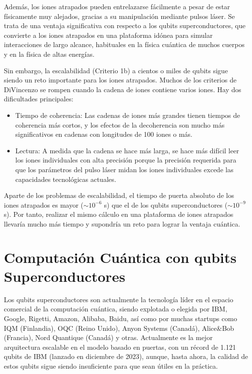Además, los iones atrapados pueden entrelazarse fácilmente a pesar de estar físicamente muy alejados, gracias a su manipulación mediante pulsos láser. Se trata de una ventaja significativa con respecto a los qubits superconductores, que convierte a los iones atrapados en una plataforma idónea para simular interacciones de largo alcance, habituales en la física cuántica de muchos cuerpos y en la física de altas energías.

Sin embargo, la escalabilidad (Criterio 1b) a cientos o miles de qubits sigue siendo un reto importante para los iones atrapados. Muchos de los criterios de DiVincenzo se rompen cuando la cadena de iones contiene varios iones. Hay dos dificultades principales:
\begin{itemize}
\item Tiempo de coherencia: Las cadenas de iones más grandes tienen tiempos de coherencia más cortos, y los efectos de la decoherencia son mucho más significativos en cadenas con longitudes de 100 iones o más.

\item Lectura: A medida que la cadena se hace más larga, se hace más difícil leer los iones individuales con alta precisión porque la precisión requerida para que los parámetros del pulso láser midan los iones individuales excede las capacidades tecnológicas actuales.
\end{itemize}

Aparte de los problemas de escalabilidad, el tiempo de puerta absoluto de los iones atrapados es mayor ($\sim 10^{-6}$ s) que el de los qubits superconductores ($\sim 10^{-9}$ s). Por tanto, realizar el mismo cálculo en una plataforma de iones atrapados llevaría mucho más tiempo y supondría un reto para lograr la ventaja cuántica.











\chapter{Computación Cuántica con qubits Superconductores} \label{sec_chapter_hw_scq}


Los qubits superconductores son actualmente la tecnología líder en el espacio comercial de la computación cuántica, siendo explotada o elegida por IBM, Google, Rigetti, Amazon, Alibaba, Baidu, así como por muchas startups como IQM (Finlandia), OQC (Reino Unido), Anyon Systems (Canadá), Alice{\&}Bob (Francia), Nord Quantique (Canadá) y otras. Actualmente es la mejor arquitectura escalable en el modelo basado en puertas, con un récord de 1.121  qubits de IBM (lanzado en diciembre de 2023), aunque, hasta ahora, la calidad de estos qubits sigue siendo insuficiente para que sean útiles en la práctica.

